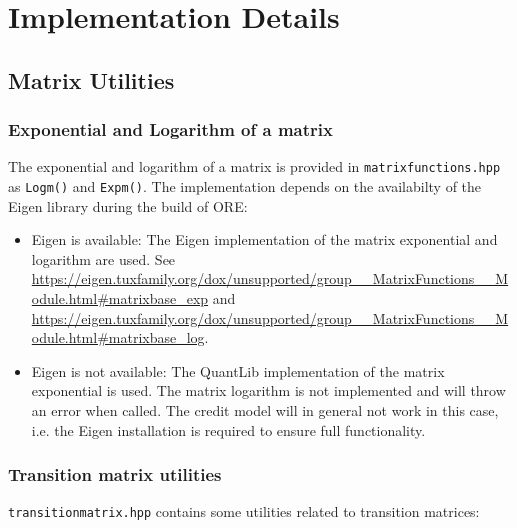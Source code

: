 \documentclass[12pt, a4paper]{article}
\begin{document}
\section{Implementation Details}

\subsection{Matrix Utilities}

\subsubsection{Exponential and Logarithm of a matrix}

The exponential and logarithm of a matrix is provided in \verb+matrixfunctions.hpp+ as \verb+Logm()+ and \verb+Expm()+. The implementation depends on the availabilty of the Eigen library \cite{Eigen} during the build of ORE:

\begin{itemize}
\item Eigen is available: The Eigen implementation of the matrix exponential and logarithm are used. See \url{https://eigen.tuxfamily.org/dox/unsupported/group__MatrixFunctions__Module.html#matrixbase_exp} and \url{https://eigen.tuxfamily.org/dox/unsupported/group__MatrixFunctions__Module.html#matrixbase_log}.
\item Eigen is not available: The QuantLib implementation of the matrix exponential is used. The matrix logarithm is not implemented and will throw an error when called. The credit model will in general not work in this case, i.e. the Eigen installation is required to ensure full functionality.
\end{itemize}

\subsubsection{Transition matrix utilities}

\verb+transitionmatrix.hpp+ contains some utilities related to transition matrices:
\end{document}
